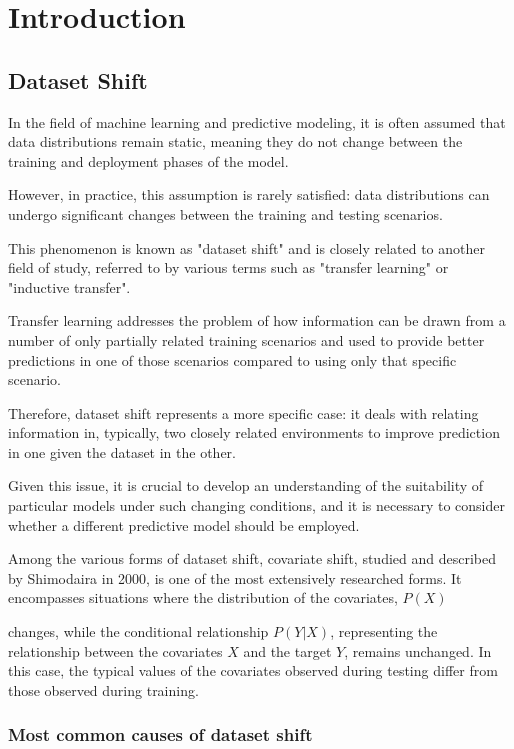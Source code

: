 \chapter{Introduction}


\section{Dataset Shift}

In the field of machine learning and predictive modeling, it is often assumed that data distributions remain static, meaning they do not change between the training and deployment phases of the model.

However, in practice, this assumption is rarely satisfied: data distributions can undergo significant changes between the training and testing scenarios.

This phenomenon is known as "dataset shift" and is closely related to another field of study, referred to by various terms such as "transfer learning" or "inductive transfer".

Transfer learning addresses the problem of how information can be drawn from a number of only partially related training scenarios and used to provide better predictions in one of those scenarios compared to using only that specific scenario.

Therefore, dataset shift represents a more specific case: it deals with relating information in, typically, two closely related environments to improve prediction in one given the dataset in the other.

Given this issue, it is crucial to develop an understanding of the suitability of particular models under such changing conditions, and it is necessary to consider whether a different predictive model should be employed.

Among the various forms of dataset shift, covariate shift, studied and described by Shimodaira in 2000, is one of the most extensively researched forms. It encompasses situations where the distribution of the covariates, $P(X)$

changes, while the conditional relationship $P(Y|X)$, representing the relationship between the covariates $X$ and the target $Y$, remains unchanged. In this case, the typical values of the covariates observed during testing differ from those observed during training.



\subsection{Most common causes of dataset shift}
	
